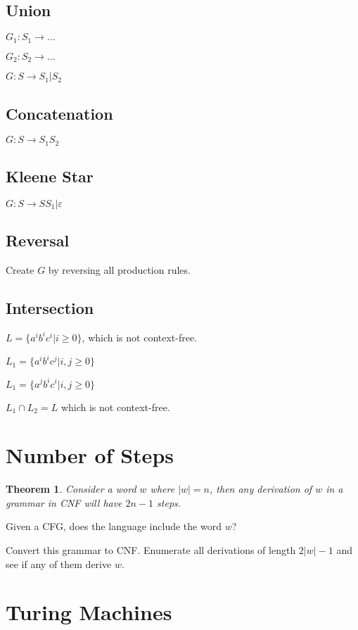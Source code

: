 \documentclass[12pt]{article}
\newtheorem{thm}{Theorem}
\theoremstyle{definition}
\begin{document}
\subsection{Union}

$G_1: S_1\to\dots$

$G_2: S_2 \to \dots$

$G: S \to S_1 | S_2$

\subsection{Concatenation}

$G: S \to S_1S_2$

\subsection{Kleene Star}

$G: S \to SS_1 | \varepsilon$

\subsection{Reversal}

Create $G$ by reversing all production rules.

\subsection{Intersection}

$L = \{a^ib^ic^i|i \ge 0\}$, which is not context-free.

$L_1 = \{a^ib^ic^j| i,j \ge 0\}$

$L_1 = \{a^jb^ic^i| i,j \ge 0\}$

$L_1 \cap L_2 = L$ which is not context-free.

\section{Number of Steps}

\begin{thm}
	Consider a word $w$ where $|w| = n$, then any derivation of $w$ in a grammar
	in CNF will have $2n-1$ steps.
\end{thm}

Given a CFG, does the language include the word $w$?

Convert this grammar to CNF. Enumerate all derivations of length
$2|w| - 1$ and see if any of them derive $w$.

\section{Turing Machines}
\end{document}
